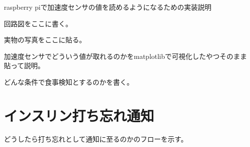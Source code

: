 raspberry piで加速度センサの値を読めるようになるための実装説明

回路図をここに書く。

実物の写真をここに貼る。

加速度センサでどういう値が取れるのかをmatplotlibで可視化したやつそのまま貼って説明。

どんな条件で食事検知とするのかを書く。

\section{インスリン打ち忘れ通知}

どうしたら打ち忘れとして通知に至るのかのフローを示す。
